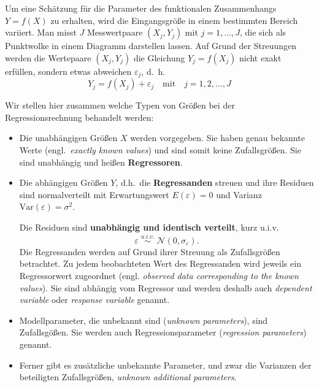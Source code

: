 Um eine Schätzung für die Parameter des funktionalen Zusammenhangs $Y = f(X)$
zu erhalten, wird die Eingangsgröße in einem bestimmten Bereich
variiert. Man misst $J$ Messwertpaare $(X_j ,Y_j )$ mit $j=1,\ldots, J$, die sich als Punktwolke in einem Diagramm darstellen lassen. Auf Grund der Streuungen werden die Wertepaare $(X_j, Y_j )$
die Gleichung $Y_j = f(X_j )$ nicht exakt erfüllen,
sondern etwas abweichen $\varepsilon_j$, d.~h.
\begin{equation}
Y_j = f(X_j) + \varepsilon_j \quad \mathrm{mit} \quad j = 1,2,\ldots,J
\label{Kap2ModellglmitResiduen}
\end{equation}

Wir stellen hier zusammen welche Typen von Größen bei der Regressionsrechnung behandelt werden:
\begin{itemize}
	\item Die unabhängigen Größen $X$ werden
	 vorgegeben. Sie haben genau bekannte Werte (engl.\ \textsl{exactly known values})
	und sind somit keine Zufallsgrößen. Sie sind unabhängig und 
	heißen \textbf{Regressoren}.
	\item Die abhängigen Größen $Y$, d.h.\ die \textbf{Regressanden} streuen und ihre Residuen sind
	normalverteilt mit Erwartungswert $E(\varepsilon) = 0$ und Varianz $\mathrm{Var}(\varepsilon) = \sigma^2$. 
	
	Die Residuen sind \textbf{unabhängig und identisch verteilt}, kurz u.i.v.
	\begin{equation}
	\varepsilon \; \overset{u.i.v.}{\sim} \; \mathcal{N}(0,\sigma_{\varepsilon}) .
	\label{Resinormalverteilt}
	\end{equation}
	Die Regressanden werden auf Grund ihrer Streuung als Zufallsgrößen betrachtet.
	Zu jedem beobachteten Wert des Regressanden wird jeweils ein Regressorwert
	zugeordnet (engl. \textsl{observed data corresponding to the known values}).
	Sie sind abhängig vom Regressor und werden deshalb auch \textsl{dependent variable} oder
	\textsl{response variable} genannt.
	\item Modellparameter, die unbekannt sind (\textsl{unknown parameters}), sind Zufallsgößen. Sie werden
	auch Regressionsparameter (\textsl{regression parameters}) genannt.
	\item Ferner gibt es zusätzliche unbekannte Parameter, und zwar die Varianzen der beteiligten
	Zufallsgrößen, \textsl{unknown additional parameters}. %
\end{itemize}
	
